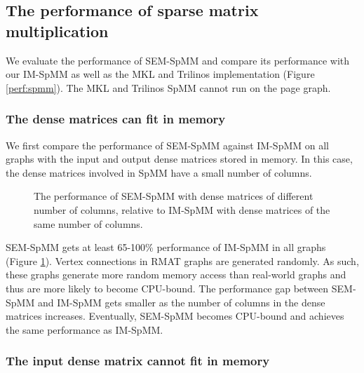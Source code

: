 \subsection{The performance of sparse matrix multiplication}

We evaluate the performance of SEM-SpMM and compare its performance with
our IM-SpMM as well as the MKL and Trilinos implementation (Figure
\ref{perf:spmm}). The MKL and Trilinos SpMM cannot run on the page graph.

\subsubsection{The dense matrices can fit in memory}

We first compare the performance of SEM-SpMM against IM-SpMM on all graphs with
the input and output dense matrices stored in memory. In this case, the dense
matrices involved in SpMM have a small number of columns.

\begin{figure}
	\begin{center}
		\footnotesize
		
		\caption{The performance of SEM-SpMM with dense matrices of different
			number of columns, relative to IM-SpMM with dense matrices of
		the same number of columns.}
		\label{perf:spmm_comp}
	\end{center}
\end{figure}

%		

SEM-SpMM gets at least 65-100\% performance of IM-SpMM in all graphs (Figure
\ref{perf:spmm_comp}). Vertex connections in RMAT graphs are generated randomly.
As such, these graphs generate more random memory access than real-world graphs
and thus are more likely to become CPU-bound. The performance gap between
SEM-SpMM and IM-SpMM gets smaller as the number of columns in the dense matrices
increases. Eventually, SEM-SpMM becomes CPU-bound and achieves the same
performance as IM-SpMM. 

\subsubsection{The input dense matrix cannot fit in memory}

